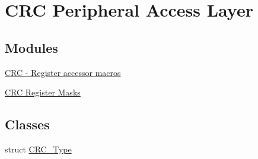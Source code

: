 \hypertarget{group__CRC__Peripheral__Access__Layer}{}\section{C\+RC Peripheral Access Layer}
\label{group__CRC__Peripheral__Access__Layer}
\subsection*{Modules}
\begin{DoxyCompactItemize}
\item 
\hyperlink{group__CRC__Register__Accessor__Macros}{C\+R\+C -\/ Register accessor macros}
\item 
\hyperlink{group__CRC__Register__Masks}{C\+R\+C Register Masks}
\end{DoxyCompactItemize}
\subsection*{Classes}
\begin{DoxyCompactItemize}
\item 
struct \hyperlink{structCRC__Type}{C\+R\+C\+\_\+\+Type}
\end{DoxyCompactItemize}
